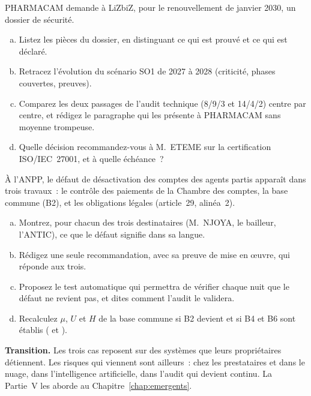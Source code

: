 \begin{boxexo}[title={\ding{45}\quad Étude de cas~14.2. Le dossier de renouvellement de PHARMACAM \niveauexpert}]
PHARMACAM demande à LiZbiZ, pour le renouvellement de janvier 2030, un
dossier de sécurité.
\begin{enumerate}[(a)]
    \item Listez les pièces du dossier, en distinguant ce qui est prouvé et
          ce qui est déclaré.
    \item Retracez l'évolution du scénario SO1 de 2027 à 2028 (criticité,
          phases couvertes, preuves).
    \item Comparez les deux passages de l'audit technique (8/9/3 et 14/4/2)
          centre par centre, et rédigez le paragraphe qui les présente à
          PHARMACAM sans moyenne trompeuse.
    \item Quelle décision recommandez-vous à M.~ETEME sur la certification
          ISO/IEC~27001, et à quelle échéance~?
\end{enumerate}
\end{boxexo}

\begin{boxexo}[title={\ding{45}\quad Étude de cas~14.3. Un défaut, trois rapports \niveauexpert}]
À l'ANPP, le défaut de désactivation des comptes des agents partis apparaît
dans trois travaux~: le contrôle des paiements de la Chambre des comptes,
la base commune (B2), et les obligations légales (article~29, alinéa~2).
\begin{enumerate}[(a)]
    \item Montrez, pour chacun des trois destinataires (M.~NJOYA, le
          bailleur, l'ANTIC), ce que le défaut signifie dans sa langue.
    \item Rédigez une seule recommandation, avec sa preuve de mise en œuvre,
          qui réponde aux trois.
    \item Proposez le test automatique qui permettra de vérifier chaque
          nuit que le défaut ne revient pas, et dites comment l'audit le
          validera.
    \item Recalculez $\mu$, $U$ et $H$ de la base commune si B2 devient \OUI{}
          et si B4 et B6 sont établis (\OUI{} et \NON{}).
\end{enumerate}
\end{boxexo}

\bigskip

\begin{boxinfo}
\textbf{Transition.} Les trois cas reposent sur des systèmes que leurs
propriétaires détiennent. Les risques qui viennent sont ailleurs~: chez les
prestataires et dans le nuage, dans l'intelligence artificielle, dans
l'audit qui devient continu. La Partie~V les aborde au
Chapitre~\ref{chap:emergents}.
\end{boxinfo}
